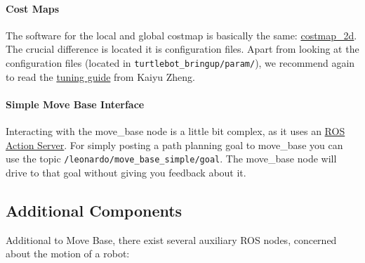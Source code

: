 \paragraph{Cost Maps}

The software for the local and global costmap is basically the same: \href{http://wiki.ros.org/costmap_2d}{costmap\_2d}. The crucial difference is located it is configuration files. Apart from looking at the configuration files (located in \verb$turtlebot_bringup/param/$), we recommend again to read the \href{http://kaiyuzheng.me/documents/navguide.pdf}{tuning guide} from Kaiyu Zheng.

\paragraph{Simple Move Base Interface}

Interacting with the move\_base node is a little bit complex, as it uses an \href{http://wiki.ros.org/actionlib/Tutorials}{ROS Action Server}. For simply posting a path planning goal to move\_base you can use the topic \verb$/leonardo/move_base_simple/goal$. The move\_base node will drive to that goal without giving you feedback about it. 

\subsection{Additional Components}
\label{ssec:AddComponents}

Additional to Move Base, there exist several auxiliary ROS nodes, concerned about the motion of a robot:

